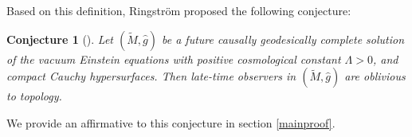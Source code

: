 \documentclass{amsart}
\newtheorem{conjecture}{Conjecture}[section]
\begin{document}
\noindent Based on this definition, Ringström proposed the following conjecture:

\begin{conjecture}[\cite{ringstrom2008future}]
Let $(\widetilde{M}, \widehat{g})$ be a future causally geodesically complete solution of the vacuum Einstein equations with positive cosmological constant $\Lambda > 0$, and compact Cauchy hypersurfaces. Then late-time observers in $(\widetilde{M}, \widehat{g})$ are oblivious to topology.
\end{conjecture}

\noindent We provide an affirmative to this conjecture in section \ref{mainproof}.  







\end{document}
